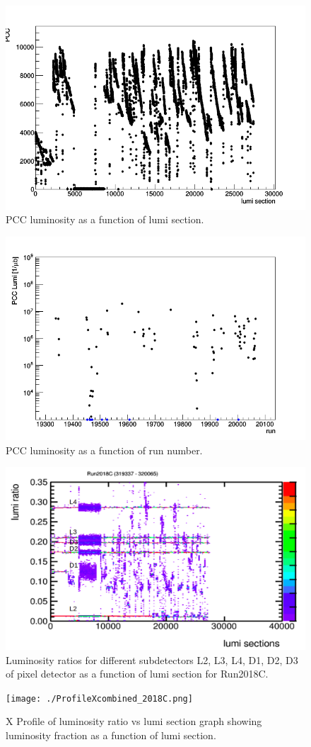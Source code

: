 \begin{figure}[H]
  \centering
  \includegraphics[width=0.5\columnwidth]{./ls_lumi_2018C.png}
  \caption{PCC luminosity as a function of lumi section.}
  \label{fig:CMS}
\end{figure}


\begin{figure}[H]
  \centering
  \includegraphics[width=0.5\columnwidth]{./runs_2018C.png}
  \caption{PCC luminosity as a function of run number.}
  \label{fig:CMS}
\end{figure}


\begin{figure}[H]
  \centering
  \includegraphics[width=0.5\columnwidth]{./2018C_lumiratio.png}
  \caption{Luminosity ratios for different subdetectors L2, L3, L4, D1, D2, D3 of pixel detector as a function of lumi section for Run2018C. }
  \label{fig:CMS}
\end{figure}


\begin{figure}[H]
  \centering
  \texttt{[image: ./ProfileXcombined\_2018C.png]}
  \caption{X Profile of luminosity ratio vs lumi section graph showing luminosity fraction as a function of lumi section.}
  \label{fig:CMS}
\end{figure}
